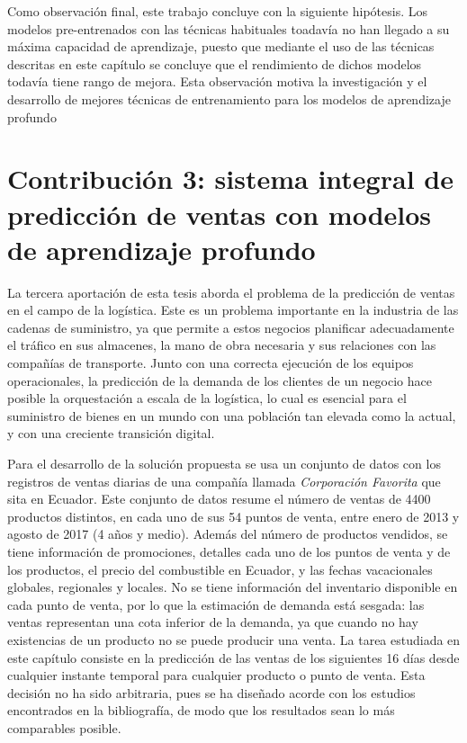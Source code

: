 \documentclass[10pt,a4paper,titlepage,table]{report}
\begin{document}
Como observación final, este trabajo concluye con la siguiente hipótesis. Los modelos pre-entrenados con las técnicas habituales toadavía no han llegado a su máxima capacidad de aprendizaje, puesto que mediante el uso de las técnicas descritas en este capítulo se concluye que el rendimiento de dichos modelos todavía tiene rango de mejora. Esta observación motiva la investigación y el desarrollo de mejores técnicas de entrenamiento para los modelos de aprendizaje profundo



\section*{Contribución 3: sistema integral de predicción de ventas con modelos de aprendizaje profundo}
La tercera aportación de esta tesis aborda el problema de la predicción de ventas en el campo de la logística. Este es un problema importante en la industria de las cadenas de suministro, ya que permite a estos negocios planificar adecuadamente el tráfico en sus almacenes, la mano de obra necesaria y sus relaciones con las compañías de transporte. Junto con una correcta ejecución de los equipos operacionales, la predicción de la demanda de los clientes de un negocio hace posible la orquestación a escala de la logística, lo cual es esencial para el suministro de bienes en un mundo con una población tan elevada como la actual, y con una creciente transición digital.

Para el desarrollo de la solución propuesta se usa un conjunto de datos con los registros de ventas diarias de una compañía llamada \textit{Corporación Favorita} que sita en Ecuador. Este conjunto de datos resume el número de ventas de 4400 productos distintos, en cada uno de sus 54 puntos de venta, entre enero de 2013 y agosto de 2017 (4 años y medio). Además del número de productos vendidos, se tiene información de promociones, detalles cada uno de los puntos de venta y de los productos, el precio del combustible en Ecuador, y las fechas vacacionales globales, regionales y locales. No se tiene información del inventario disponible en cada punto de venta, por lo que la estimación de demanda está sesgada: las ventas representan una cota inferior de la demanda, ya que cuando no hay existencias de un producto no se puede producir una venta. La tarea estudiada en este capítulo consiste en la predicción de las ventas de los siguientes 16 días desde cualquier instante temporal para cualquier producto o punto de venta. Esta decisión no ha sido arbitraria, pues se ha diseñado acorde con los estudios encontrados en la bibliografía, de modo que los resultados sean lo más comparables posible. 
\end{document}
